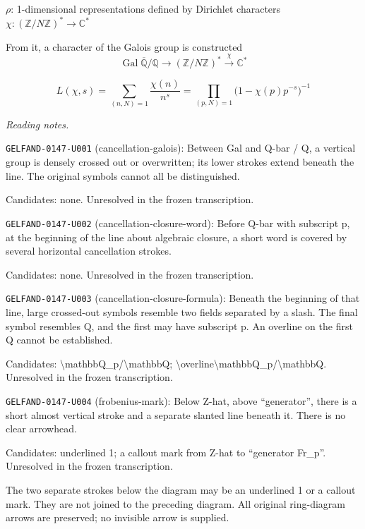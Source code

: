 $\rho$: 1-dimensional representations defined by Dirichlet characters
$\chi:(\mathbb{Z}/N\mathbb{Z})^*\longrightarrow\mathbb{C}^*$

From it, a character of the Galois group is constructed
\begin{equation*}
\operatorname{Gal}\overline{\mathbb{Q}}/\mathbb{Q}
\longrightarrow (\mathbb{Z}/N\mathbb{Z})^*
\overset{\chi}{\longrightarrow}\mathbb{C}^*
\end{equation*}

\begin{equation*}
L(\chi,s)=\sum_{(n,N)=1}\frac{\chi(n)}{n^s}
=\prod_{(p,N)=1}\bigl(1-\chi(p)p^{-s}\bigr)^{-1}
\end{equation*}



\par\smallskip\noindent\textit{Reading notes.}\par
\noindent\texttt{GELFAND-0147-U001} (cancellation-galois): Between Gal and Q-bar / Q, a vertical group is densely crossed out or overwritten; its lower strokes extend beneath the line. The original symbols cannot all be distinguished.\par
Candidates: none. Unresolved in the frozen transcription.\par
\noindent\texttt{GELFAND-0147-U002} (cancellation-closure-word): Before Q-bar with subscript p, at the beginning of the line about algebraic closure, a short word is covered by several horizontal cancellation strokes.\par
Candidates: none. Unresolved in the frozen transcription.\par
\noindent\texttt{GELFAND-0147-U003} (cancellation-closure-formula): Beneath the beginning of that line, large crossed-out symbols resemble two fields separated by a slash. The final symbol resembles Q, and the first may have subscript p. An overline on the first Q cannot be established.\par
Candidates: \textbackslash{}mathbb{Q}\_p/\textbackslash{}mathbb{Q}; \textbackslash{}overline{\textbackslash{}mathbb{Q}}\_p/\textbackslash{}mathbb{Q}. Unresolved in the frozen transcription.\par
\noindent\texttt{GELFAND-0147-U004} (frobenius-mark): Below Z-hat, above “generator”, there is a short almost vertical stroke and a separate slanted line beneath it. There is no clear arrowhead.\par
Candidates: underlined 1; a callout mark from Z-hat to “generator Fr\_p”. Unresolved in the frozen transcription.\par
The two separate strokes below the diagram may be an underlined 1 or a callout mark. They are not joined to the preceding diagram. All original ring-diagram arrows are preserved; no invisible arrow is supplied.\par


